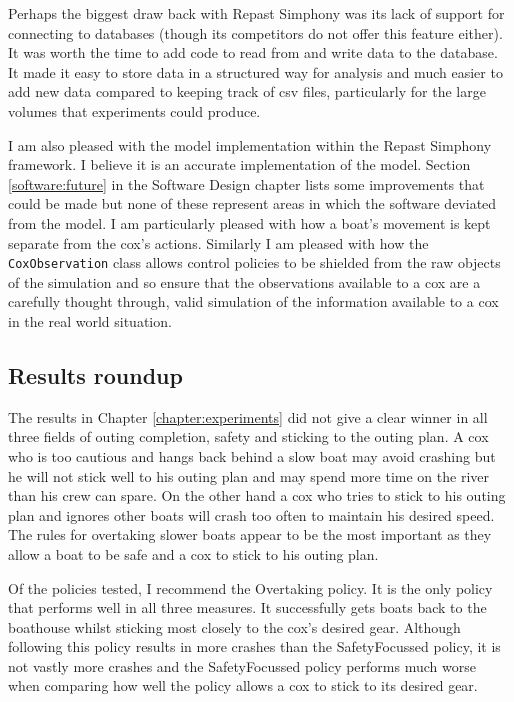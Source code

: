   Perhaps the biggest draw back with Repast Simphony was its lack of support for connecting to databases (though its competitors do not offer this feature either). It was worth the time to add code to read from and write data to the database. It made it easy to store data in a structured way for analysis and much easier to add new data compared to keeping track of csv files, particularly for the large volumes that experiments could produce. 
  
  I am also pleased with the model implementation within the Repast Simphony framework. I believe it is an accurate implementation of the model. Section \ref{software:future} in the Software Design chapter lists some improvements that could be made but none of these represent areas in which the software deviated from the model. I am particularly pleased with how a boat's movement is kept separate from the cox's actions. Similarly I am pleased with how the \texttt{CoxObservation} class allows control policies to be shielded from the raw objects of the simulation and so ensure that the observations available to a cox are a carefully thought through, valid simulation of the information available to a cox in the real world situation.
  
  \subsection{Results roundup}
  The results in Chapter \ref{chapter:experiments} did not give a clear winner in all three fields of outing completion, safety and sticking to the outing plan. A cox who is too cautious and hangs back behind a slow boat may avoid crashing but he will not stick well to his outing plan and may spend more time on the river than his crew can spare. On the other hand a cox who tries to stick to his outing plan and ignores other boats will crash too often to maintain his desired speed. The rules for overtaking slower boats appear to be the most important as they allow a boat to be safe and a cox to stick to his outing plan. 
  
  Of the policies tested, I recommend the Overtaking policy. It is the only policy that performs well in all three measures. It successfully gets boats back to the boathouse whilst sticking most closely to the cox's desired gear. Although following this policy results in more crashes than the SafetyFocussed policy, it is not vastly more crashes and the SafetyFocussed policy performs much worse when comparing how well the policy allows a cox to stick to its desired gear.
  
